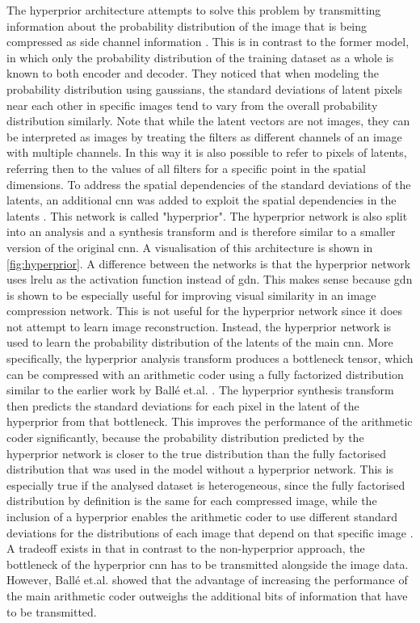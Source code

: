 The hyperprior architecture attempts to solve this problem by transmitting information about the probability distribution of the image that is being compressed as side channel information \citep{balle_variational_2018}. This is in contrast to the former model, in which only the probability distribution of the training dataset as a whole is known to both encoder and decoder. They noticed that when modeling the probability distribution using gaussians, the standard deviations of latent pixels near each other in specific images tend to vary from the overall probability distribution similarly. Note that while the latent vectors are not images, they can be interpreted as images by treating the filters as different channels of an image with multiple channels. In this way it is also possible to refer to pixels of latents, referring then to the values of all filters for a specific point in the spatial dimensions. To address the spatial dependencies of the standard deviations of the latents, an additional \ac{cnn} was added to exploit the spatial dependencies in the latents \citep{balle_variational_2018}. This network is called "hyperprior". The hyperprior network is also split into an analysis and a synthesis transform and is therefore similar to a smaller version of the original \ac{cnn}. A visualisation of this architecture is shown in \autoref{fig:hyperprior}. A difference between the networks is that the hyperprior network uses \ac{lrelu} as the activation function instead of \ac{gdn}. This makes sense because \ac{gdn} is shown to be especially useful for improving visual similarity in an image compression network. This is not useful for the hyperprior network since it does not attempt to learn image reconstruction. Instead, the hyperprior network is used to learn the probability distribution of the latents of the main \ac{cnn}. More specifically, the hyperprior analysis transform produces a bottleneck tensor, which can be compressed with an arithmetic coder using a fully factorized distribution similar to the earlier work by Ballé et.al. \citep{balle_end--end_2017}. The hyperprior synthesis transform then predicts the standard deviations for each pixel in the latent of the hyperprior from that bottleneck. This improves the performance of the arithmetic coder significantly, because the probability distribution predicted by the hyperprior network is closer to the true distribution than the fully factorised distribution that was used in the model without a hyperprior network. This is especially true if the analysed dataset is heterogeneous, since the fully factorised distribution by definition is the same for each compressed image, while the inclusion of a hyperprior enables the arithmetic coder to use different standard deviations for the distributions of each image that depend on that specific image \citep{balle_variational_2018}. A tradeoff exists in that in contrast to the non-hyperprior approach, the bottleneck of the hyperprior \ac{cnn} has to be transmitted alongside the image data. However, Ballé et.al. \citep{balle_variational_2018} showed that the advantage of increasing the performance of the main arithmetic coder outweighs the additional bits of information that have to be transmitted.

